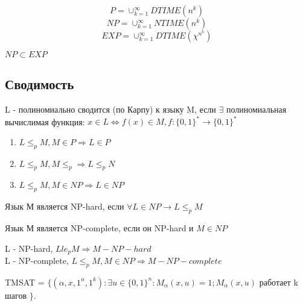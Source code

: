\documentclass{article}
\begin{document}
 
	$$P = \cup_{k=1}^\infty DTIME (n^k)$$
	$$NP = \cup_{k=1}^\infty NTIME(n^k)$$
	$$EXP=\cup_{k=1}^\infty DTIME(\chi^{n^k})$$
	
	\begin{theorem}
		$NP \subset EXP$
	\end{theorem}
	
	\subsection{Сводимость}
	
	\begin{definition}
		L - полиномиально сводится  (по Карпу) к языку M, если $\exists$ полиномиальная вычислимая функция:
		$x \in L \Leftrightarrow f(x) \in M, f: \{0,1\}^* \to \{0,1\}^*$
	\end{definition}
	
	\begin{statement}
		\begin{enumerate}
			\item $L \le_p M, M \in P \Rightarrow L \in P$
			\item $L \le_p M, M \le_p \Rightarrow L \le_p N$
			\item $L \le_p M, M \in NP \Rightarrow L \in NP$
		\end{enumerate}
	\end{statement}
	
	\begin{definition}
		Язык М является NP-hard, если $\forall L \in NP \to L \le_p M$
	\end{definition}
	
	\begin{definition}
		Язык М является NP-complete, если он NP-hard и $M \in NP$
	\end{definition}
	
	\begin{statement}
		L - NP-hard, $L le_p M \Rightarrow  M -NP-hard$\\
		L - NP-complete, $L \le_p M, M \in NP \Rightarrow M - NP-complete$
	\end{statement}
	
	\begin{definition}
		TMSAT = $\{(\alpha,x,1^n,1^k) : \exists u \in \{0,1\}^n : M_{\alpha}(x,u) = 1;  M_{\alpha}(x,u)$ работает k шагов $\}$. 
	\end{definition}
	
\end{document}
